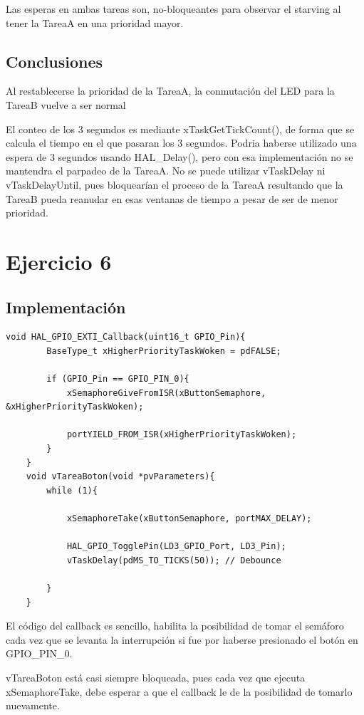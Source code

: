 \documentclass[12pt]{article}
\begin{document}
Las esperas en ambas tareas son, no-bloqueantes para observar el starving al tener la TareaA
en una prioridad mayor.
\subsection{Conclusiones}
Al restablecerse la prioridad de la TareaA, la 
conmutación del LED para la TareaB vuelve a ser normal

El conteo de los 3 segundos es mediante xTaskGetTickCount(), de forma
que se calcula el tiempo en el que pasaran los 3 segundos.
Podria haberse utilizado una espera de 3 segundos usando HAL\_Delay(), pero 
con esa implementación no se mantendra el parpadeo de la TareaA.
No se puede utilizar vTaskDelay ni vTaskDelayUntil, pues bloquearían
el proceso de la TareaA resultando que la TareaB pueda reanudar
en esas ventanas de tiempo a pesar de ser de menor prioridad.


\section{Ejercicio 6}
\subsection{Implementación}
\begin{lstlisting}[style=CStyle]
    void HAL_GPIO_EXTI_Callback(uint16_t GPIO_Pin){
        BaseType_t xHigherPriorityTaskWoken = pdFALSE;

        if (GPIO_Pin == GPIO_PIN_0){
            xSemaphoreGiveFromISR(xButtonSemaphore, &xHigherPriorityTaskWoken);

            portYIELD_FROM_ISR(xHigherPriorityTaskWoken);
        }
    }
    void vTareaBoton(void *pvParameters){
        while (1){

            xSemaphoreTake(xButtonSemaphore, portMAX_DELAY);

            HAL_GPIO_TogglePin(LD3_GPIO_Port, LD3_Pin);
            vTaskDelay(pdMS_TO_TICKS(50)); // Debounce

        }
    }

\end{lstlisting}
El código del callback es sencillo, habilita la posibilidad de tomar
el semáforo cada vez que se levanta la interrupción si 
fue por haberse presionado el botón en GPIO\_PIN\_0.

vTareaBoton está casi siempre bloqueada, pues
cada vez que ejecuta xSemaphoreTake, debe esperar
a que el callback le de la posibilidad de tomarlo nuevamente.
\end{document}
